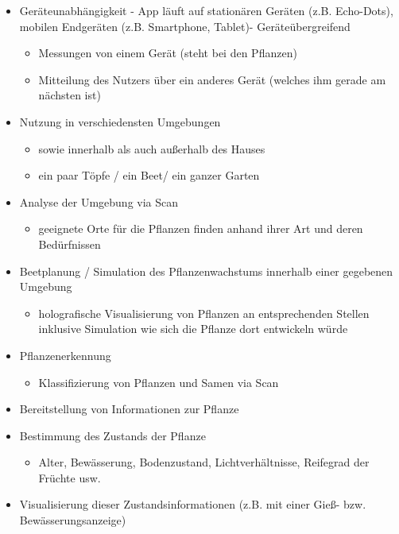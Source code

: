 \begin{itemize}
\tightlist
\item
  Geräteunabhängigkeit - App läuft auf stationären Geräten (z.B.
  Echo-Dots), mobilen Endgeräten (z.B. Smartphone, Tablet)-
  Geräteübergreifend

  \begin{itemize}
  \tightlist
  \item
    Messungen von einem Gerät (steht bei den Pflanzen)
  \item
    Mitteilung des Nutzers über ein anderes Gerät (welches ihm gerade am
    nächsten ist)
  \end{itemize}
\item
  Nutzung in verschiedensten Umgebungen

  \begin{itemize}
  \tightlist
  \item
    sowie innerhalb als auch außerhalb des Hauses
  \item
    ein paar Töpfe / ein Beet/ ein ganzer Garten
  \end{itemize}
\item
  Analyse der Umgebung via Scan

  \begin{itemize}
  \tightlist
  \item
    geeignete Orte für die Pflanzen finden anhand ihrer Art und deren
    Bedürfnissen
  \end{itemize}
\item
  Beetplanung / Simulation des Pflanzenwachstums innerhalb einer
  gegebenen Umgebung

  \begin{itemize}
  \tightlist
  \item
    holografische Visualisierung von Pflanzen an entsprechenden Stellen
    inklusive Simulation wie sich die Pflanze dort entwickeln würde
  \end{itemize}
\item
  Pflanzenerkennung

  \begin{itemize}
  \tightlist
  \item
    Klassifizierung von Pflanzen und Samen via Scan
  \end{itemize}
\item
  Bereitstellung von Informationen zur Pflanze
\item
  Bestimmung des Zustands der Pflanze

  \begin{itemize}
  \tightlist
  \item
    Alter, Bewässerung, Bodenzustand, Lichtverhältnisse, Reifegrad der
    Früchte usw.
  \end{itemize}
\item
  Visualisierung dieser Zustandsinformationen (z.B. mit einer Gieß- bzw.
  Bewässerungsanzeige)


\end{itemize}
